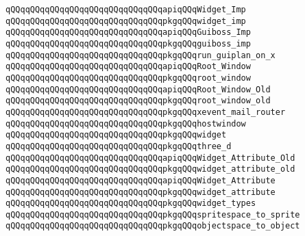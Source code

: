 \verb|qQQqqQQqqQQqqQQqqQQqqQQqqQQqqQQqapiqQQqWidget_Imp|\newline
\verb|qQQqqQQqqQQqqQQqqQQqqQQqqQQqqQQqpkgqQQqwidget_imp|\newline
\newline
\newline
\verb|qQQqqQQqqQQqqQQqqQQqqQQqqQQqqQQqapiqQQqGuiboss_Imp|\newline
\verb|qQQqqQQqqQQqqQQqqQQqqQQqqQQqqQQqpkgqQQqguiboss_imp|\newline
\newline
\verb|qQQqqQQqqQQqqQQqqQQqqQQqqQQqqQQqpkgqQQqrun_guiplan_on_x|\newline
\newline
\verb|qQQqqQQqqQQqqQQqqQQqqQQqqQQqqQQqapiqQQqRoot_Window|\newline
\verb|qQQqqQQqqQQqqQQqqQQqqQQqqQQqqQQqpkgqQQqroot_window|\newline
\newline
\verb|qQQqqQQqqQQqqQQqqQQqqQQqqQQqqQQqapiqQQqRoot_Window_Old|\newline
\verb|qQQqqQQqqQQqqQQqqQQqqQQqqQQqqQQqpkgqQQqroot_window_old|\newline
\newline
\verb|qQQqqQQqqQQqqQQqqQQqqQQqqQQqqQQqpkgqQQqxevent_mail_router|\newline
\verb|qQQqqQQqqQQqqQQqqQQqqQQqqQQqqQQqpkgqQQqhostwindow|\newline
\verb|qQQqqQQqqQQqqQQqqQQqqQQqqQQqqQQqpkgqQQqwidget|\newline
\verb|qQQqqQQqqQQqqQQqqQQqqQQqqQQqqQQqpkgqQQqthree_d|\newline
\newline
\verb|qQQqqQQqqQQqqQQqqQQqqQQqqQQqqQQqapiqQQqWidget_Attribute_Old|\newline
\verb|qQQqqQQqqQQqqQQqqQQqqQQqqQQqqQQqpkgqQQqwidget_attribute_old|\newline
\newline
\verb|qQQqqQQqqQQqqQQqqQQqqQQqqQQqqQQqapiqQQqWidget_Attribute|\newline
\verb|qQQqqQQqqQQqqQQqqQQqqQQqqQQqqQQqpkgqQQqwidget_attribute|\newline
\newline
\verb|qQQqqQQqqQQqqQQqqQQqqQQqqQQqqQQqpkgqQQqwidget_types|\newline
\newline
\verb|qQQqqQQqqQQqqQQqqQQqqQQqqQQqqQQqpkgqQQqspritespace_to_sprite|\newline
\verb|qQQqqQQqqQQqqQQqqQQqqQQqqQQqqQQqpkgqQQqobjectspace_to_object|\newline

